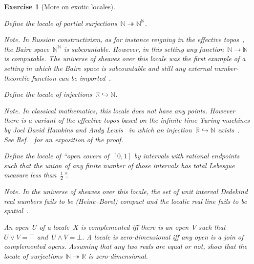 \documentclass{ws-rv9x6}
\newtheorem{ex}{Exercise}
\newenvironment{exercise}[1]{
  \begin{ex}[#1]
}{\end{ex}}
\newcommand{\NN}{\mathbb{N}}
\newcommand{\RR}{\mathbb{R}}
\renewcommand{\_}{\mathpunct{.}}
\newcommand{\?}{\,{:}\,}
\begin{document}
\begin{exercise}{More on exotic locales}%
\label{ex:exotic-locales}%
\begin{alphlist}[(d)]
\item Define the locale of partial surjections~$\NN \twoheadrightarrow \NN^\NN$.\smallskip

{\scriptsize\emph{Note.} In Russian constructivism, as for instance reigning in
the ef{}fective topos~\cite{hyland:effective-topos,phoa:effective,bauer:c2c}, the Baire space~$\NN^\NN$ is subcountable.
However, in this setting any function~$\NN \to \NN$ is computable.
The universe of sheaves over this locale was the first example of a setting in
which the Baire space is subcountable and still any external number-theoretic
function can be imported~\cite[Section~4.3]{scedrov:forcing}.\par}
\item Define the locale of injections~$\RR \hookrightarrow \NN$.\smallskip

{\scriptsize\emph{Note.} In classical mathematics, this locale does not have
any points. However there is a variant of the ef{}fective topos based on the
infinite-time Turing machines by Joel David Hamkins and Andy
Lewis~\cite{hamkins-lewis:ittm} in which an injection~$\RR \hookrightarrow \NN$
exists~\cite{bauer:injection}. See
Ref.~\cite[Section~2.2]{blechschmidt:custom-tailored} for an exposition of the
proof.\par}

\item Define the locale of ``open covers of~$[0,1]$ by intervals with rational
endpoints such that the union of any finite number of those intervals has total
Lebesgue measure less than~$\frac{1}{2}$''.\smallskip

{\scriptsize\emph{Note.} In the universe of sheaves over this locale, the set
of unit interval Dedekind real numbers fails to be (Heine--Borel) compact and
the localic real line fails to be
spatial~\cite[Example~D4.7.13]{johnstone:elephant}.\par}
\item An open~$U$ of a locale~$X$ is \emph{complemented} iff there is an
open~$V$ such that~$U \vee V = \top$ and~$U \wedge V = \bot$. A locale is
\emph{zero-dimensional} iff any open is a join of complemented opens. Assuming
that any two reals are equal or not, show that the locale of surjections~$\NN
\twoheadrightarrow \RR$ is zero-dimensional.
\end{alphlist}
\end{exercise}
\end{document}
